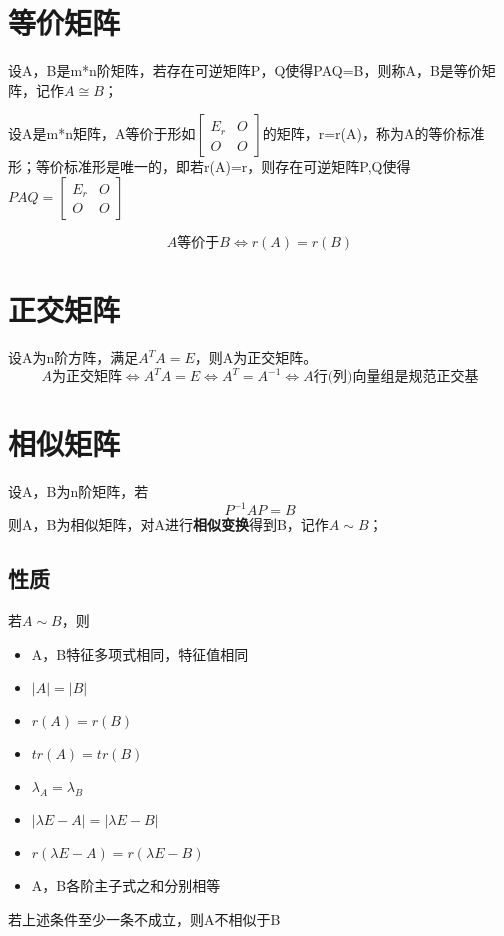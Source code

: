 \section{等价矩阵}

设A，B是m*n阶矩阵，若存在可逆矩阵P，Q使得PAQ=B，则称A，B是等价矩阵，记作\(A \cong B\)；

设A是m*n矩阵，A等价于形如\(\begin{bmatrix}
E_r & O \\ 
O & O
\end{bmatrix}\)的矩阵，r=r(A)，称为A的等价标准形；等价标准形是唯一的，即若r(A)=r，则存在可逆矩阵P,Q使得\(PAQ = \begin{bmatrix}
E_r & O \\ 
O & O
\end{bmatrix}\)

\[A \text{等价于} B \Leftrightarrow r(A) = r(B)\]
\mymatrix


\section{正交矩阵}
设A为n阶方阵，满足\(A^TA = E\)，则A为正交矩阵。
\[A\text{为正交矩阵} \Leftrightarrow A^TA = E \Leftrightarrow A^T = A^{-1} \Leftrightarrow A\text{行(列)向量组是规范正交基}\]


\section{相似矩阵}

设A，B为n阶矩阵，若
\[P^{-1}AP = B\]
则A，B为相似矩阵，对A进行\textbf{相似变换}得到B，记作\(A \sim B\)；

\subsection{性质}
若\(A \sim B\)，则
\begin{itemize}
    \item A，B特征多项式相同，特征值相同
    \item \(|A| = |B|\)
    \item \(r(A) = r(B)\)
    \item \(tr(A) = tr(B)\)
    \item \(\lambda_A = \lambda_B\)
    \item \(|\lambda E - A| = |\lambda E - B|\)
    \item \(r(\lambda E - A) = r(\lambda E - B)\)
    \item A，B各阶主子式之和分别相等
\end{itemize}
若上述条件至少一条不成立，则A不相似于B

